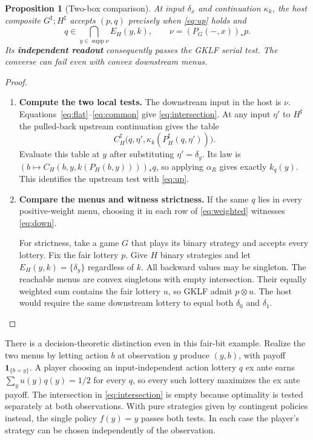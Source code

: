 \documentclass[11pt,a4paper]{article}
\newtheorem{proposition}[theorem]{Proposition}
\theoremstyle{definition}
\newcommand{\supp}{\operatorname{supp}}
\begin{document}
\begin{proposition}[Two-box comparison]\label{prop:two}
    At input $\delta_x$ and continuation $\kappa_k$, the host composite $G^\sharp;H^\sharp$ accepts $(p,q)$ precisely when \eqref{eq:up} holds and
    \begin{equation}
        q\in\bigcap_{y\in\supp\nu}E_H(y,k),
        \qquad \nu=(P_G(-,x))_*p.
        \label{eq:intersection}
    \end{equation}
    Its \textbf{independent readout} consequently passes the GKLF serial test. The converse can fail even with convex downstream menus.
\end{proposition}
\begin{proof}\leavevmode
    \begin{enumerate}[titledsteps]
        \item \textbf{Compute the two local tests.} The downstream input in the host is $\nu$. Equations~\eqref{eq:flat}--\eqref{eq:common} give \eqref{eq:intersection}. At any input $\eta'$ to $H^\sharp$ the pulled-back upstream continuation gives the table
        \[
            C^\sharp_H\bigl(q,\eta',\kappa_k(P^\sharp_H(q,\eta'))\bigr).
        \]
        Evaluate this table at $y$ after substituting $\eta'=\delta_y$. Its law is $(b\mapsto C_H(b,y,k(P_H(b,y))))_*q$, so applying $\alpha_R$ gives exactly $k_q(y)$. This identifies the upstream test with \eqref{eq:up}.

        \item \textbf{Compare the menus and witness strictness.} If the same $q$ lies in every positive-weight menu, choosing it in each row of \eqref{eq:weighted} witnesses \eqref{eq:down}.

        For strictness, take a game $G$ that plays its binary strategy and accepts every lottery. Fix the fair lottery $p$. Give $H$ binary strategies and let $E_H(y,k)=\{\delta_y\}$ regardless of $k$. All backward values may be singleton. The reachable menus are convex singletons with empty intersection. Their equally weighted sum contains the fair lottery $u$, so GKLF admit $p\otimes u$. The host would require the same downstream lottery to equal both $\delta_0$ and $\delta_1$.\qedhere
    \end{enumerate}
\end{proof}

There is a decision-theoretic distinction even in this fair-bit example. Realize the two menus by letting action $b$ at observation $y$ produce $(y,b)$, with payoff $\mathbf 1_{\{b=y\}}$. A player choosing an input-independent action lottery $q$ ex ante earns $\sum_y u(y)q(y)=1/2$ for every $q$, so every such lottery maximizes the ex ante payoff. The intersection in \eqref{eq:intersection} is empty because optimality is tested separately at both observations. With pure strategies given by contingent policies instead, the single policy $f(y)=y$ passes both tests. In each case the player's strategy can be chosen independently of the observation.
\end{document}
